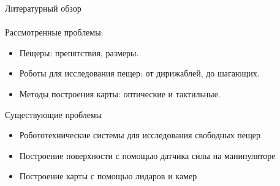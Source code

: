 \documentclass[aspectratio=169,xcolor=table]{beamer}
\begin{document}



\begin{frame}[t]{Литературный обзор}
    \framesubtitle{}
    \vspace{-0.3cm}
    \large
    Рассмотренные проблемы:
    \vspace{-0.1cm}
    \begin{itemize}
        \item Пещеры: препятствия, размеры.
        \item Роботы для исследования пещер: от дирижаблей, до шагающих.
        \item Методы построения карты: оптические и тактильные.
    \end{itemize}
    \vspace{-0.2cm}

    \begin{block}{Существующие проблемы}
        \begin{itemize}
            \item Робототехнические системы для исследования свободных пещер
            \item Построение поверхности с помощью датчика силы на манипуляторе
            \item Построение карты с помощью лидаров и камер
        \end{itemize}
    \end{block}
    \vspace{-0.2cm}

\end{frame}
\end{document}
